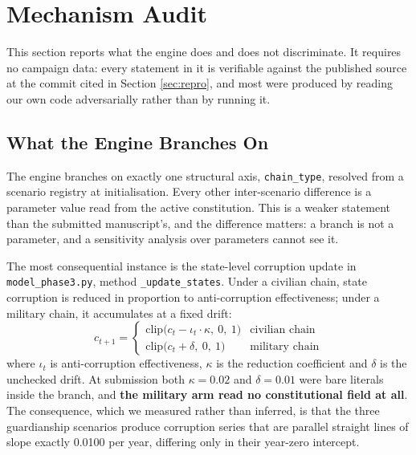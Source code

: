 \documentclass{ieeeaccess}
\begin{document}
\section{Mechanism Audit}
\label{sec:mechanism}

This section reports what the engine does and does not discriminate. It
requires no campaign data: every statement in it is verifiable against
the published source at the commit cited in Section \ref{sec:repro}, and
most were produced by reading our own code adversarially rather than by
running it.

\subsection{What the Engine Branches On}
\label{sec:branch}
The engine branches on exactly one structural axis,
\texttt{chain\_type}, resolved from a scenario registry at
initialisation. Every other inter-scenario difference is a parameter
value read from the active constitution. This is a weaker statement than
the submitted manuscript's, and the difference matters: a branch is not
a parameter, and a sensitivity analysis over parameters cannot see it.

The most consequential instance is the state-level corruption update in
\texttt{model\_phase3.py}, method \texttt{\_update\_states}. Under a
civilian chain, state corruption is reduced in proportion to
anti-corruption effectiveness; under a military chain, it accumulates at
a fixed drift:
\begin{equation}
c_{t+1} =
\begin{cases}
\mathrm{clip}\big(c_t - \iota_t \cdot \kappa,\ 0,\ 1\big) & \text{civilian chain}\\[2pt]
\mathrm{clip}\big(c_t + \delta,\ 0,\ 1\big) & \text{military chain}
\end{cases}
\label{eq:corruption}
\end{equation}
where $\iota_t$ is anti-corruption effectiveness, $\kappa$ is the
reduction coefficient and $\delta$ is the unchecked drift. At submission
both $\kappa=0.02$ and $\delta=0.01$ were bare literals inside the
branch, and \textbf{the military arm read no constitutional field at
all}. The consequence, which we measured rather than inferred, is that
the three guardianship scenarios produce corruption series that are
parallel straight lines of slope exactly 0.0100 per year, differing only
in their year-zero intercept.
\end{document}
